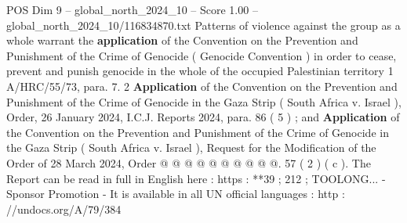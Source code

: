 \begin{textsample}{POS Dim 9 – global\_north\_2024\_10 – Score 1.00 – global\_north\_2024\_10/116834870.txt}
Patterns of violence against the group as a whole warrant the \textbf{application} of the Convention on the Prevention and Punishment of the Crime of Genocide ( Genocide Convention ) in order to cease, prevent and punish genocide in the whole of the occupied Palestinian territory 1 A/HRC/55/73, para. 7. 2 \textbf{Application} of the Convention on the Prevention and Punishment of the Crime of Genocide in the Gaza Strip ( South Africa v.
Israel ), Order, 26 January 2024, I.C.J.
Reports 2024, para. 86 ( 5 ) ; and \textbf{Application} of the Convention on the Prevention and Punishment of the Crime of Genocide in the Gaza Strip ( South Africa v.
Israel ), Request for the Modification of the Order of 28 March 2024, Order @ @ @ @ @ @ @ @ @ @. 57 ( 2 ) ( c ).
The Report can be read in full in English here : https : **39 ; 212 ; TOOLONG... - Sponsor Promotion - It is available in all UN official languages : http : //undocs.org/A/79/384

\end{textsample}
